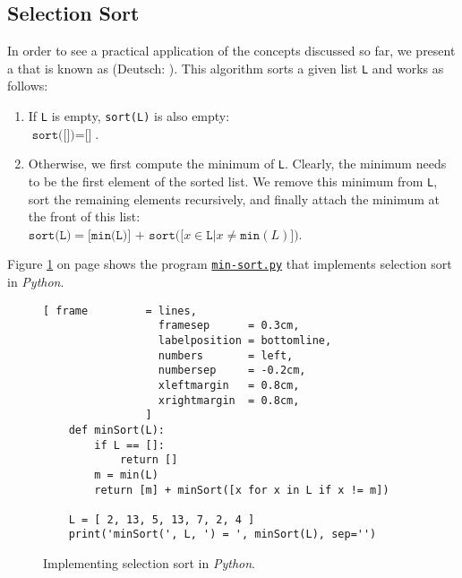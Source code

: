 \subsection{Selection Sort}
In order to see a practical application of the concepts discussed so far, we present a 
that is known as \href{https://en.wikipedia.org/wiki/Selection_sort}{}
(Deutsch: ).  
This algorithm sorts a given list \texttt{L} and works as follows:
\begin{enumerate}
\item If \texttt{L} is empty, \texttt{sort(L)} is also empty:
      \\[0.2cm]
      \hspace*{1.3cm}
      $\texttt{sort([])} = \texttt{[]}$.
\item Otherwise, we first compute the minimum of \texttt{L}.  Clearly, the minimum needs to be the
      first element of the sorted list.  We remove this minimum from \texttt{L}, sort the remaining
      elements recursively, and finally attach the minimum at the front of this list:
      \\[0.2cm]
      \hspace*{1.3cm}
      $\texttt{sort(L)} = \texttt{[min(L)] + sort([}x \in \texttt{L} \texttt{|} x \not= \texttt{min}(L)\texttt{])}$.
\end{enumerate}
Figure \ref{fig:min-sort.py} on page \pageref{fig:min-sort.py} shows the program
\href{https://github.com/karlstroetmann/Logic/blob/master/Python/min-sort.py}{\texttt{min-sort.py}}
that implements selection sort  in \textsl{Python}. 

\begin{figure}[!ht]
\centering
\begin{Verbatim}[ frame         = lines, 
                  framesep      = 0.3cm, 
                  labelposition = bottomline,
                  numbers       = left,
                  numbersep     = -0.2cm,
                  xleftmargin   = 0.8cm,
                  xrightmargin  = 0.8cm,
                ]
    def minSort(L):
        if L == []:
            return []
        m = min(L)
        return [m] + minSort([x for x in L if x != m])
    
    L = [ 2, 13, 5, 13, 7, 2, 4 ]
    print('minSort(', L, ') = ', minSort(L), sep='')
\end{Verbatim}
\vspace*{-0.3cm}
\caption{Implementing selection sort in \textsl{Python}.}
\label{fig:min-sort.py}
\end{figure}


